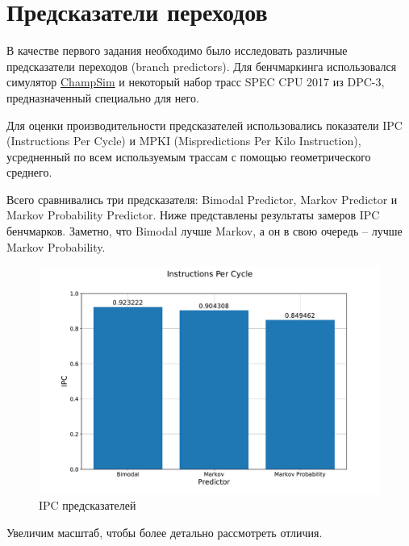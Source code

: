 


	
	
	\section*{Предсказатели переходов}

	В качестве первого задания необходимо было исследовать различные предсказатели переходов (branch predictors). Для бенчмаркинга использовался симулятор \href{https://github.com/ChampSim/ChampSim}{ChampSim} и некоторый набор трасс SPEC CPU 2017 из DPC-3, предназначенный специально для него.
	
	Для оценки производительности предсказателей использовались показатели IPC (Instructions Per Cycle) и MPKI (Mispredictions Per Kilo Instruction), усредненный по всем используемым трассам с помощью геометрического среднего.
	
	Всего сравнивались три предсказателя: Bimodal Predictor, Markov Predictor и Markov Probability Predictor. Ниже представлены результаты замеров IPC бенчмарков. Заметно, что Bimodal лучше Markov, а он в свою очередь -- лучше Markov Probability. 
	
	\begin{figure}[h!]
		\centering
		\includegraphics[width=\linewidth]{./pictures/ipc_gmean.pdf}
		\caption{IPC предсказателей}
	\end{figure}
	
	\newpage
	Увеличим масштаб, чтобы более детально рассмотреть отличия.

